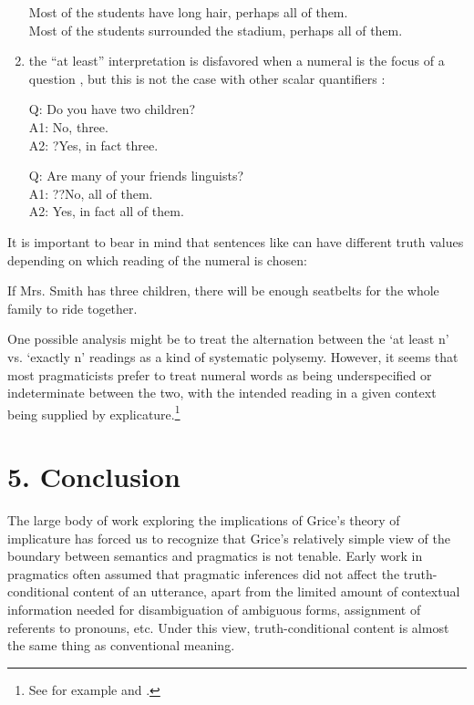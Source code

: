 \begin{enumerate}
\ea \label{ex:9.31}
\ea Most of the students have long hair, perhaps all of them.\\
\ex Most of the students surrounded the stadium, perhaps all of them.
                       \z
\z

\item the “at least” interpretation is disfavored when a numeral is the focus of a question , but this is not the case with other scalar quantifiers :

\ea
Q: Do you have two children?\\
A1: No, three.\\
A2: ?Yes, in fact three.
\z

\ea
Q: Are many of your friends linguists?\\
A1: ??No, all of them.\\
A2: Yes, in fact all of them.
\z
\end{enumerate}


It is important to bear in mind that sentences like  can have different truth values depending on which reading of the numeral is chosen:


\ea \label{ex:9.34}
If Mrs. Smith has three children, there will be enough seatbelts for the whole family to ride together.
\z


One possible analysis might be to treat the alternation between the ‘at least n’ vs. ‘exactly n’ readings as a kind of systematic polysemy. However, it seems that most pragmaticists prefer to treat numeral words as being underspecified or indeterminate between the two, with the intended reading in a given context being supplied by explicature.\footnote{See for example \citet{Horn1992} and \citet{Carston1998}.}


\section{5. Conclusion}\label{sec:}

The large body of work exploring the implications of Grice’s theory of implicature has forced us to recognize that Grice’s relatively simple view of the boundary between semantics and pragmatics is not tenable. Early work in pragmatics often assumed that pragmatic inferences did not affect the truth-conditional content of an utterance, apart from the limited amount of contextual information needed for disambiguation of ambiguous forms, assignment of referents to pronouns, etc. Under this view, truth-conditional content is almost the same thing as conventional meaning.




